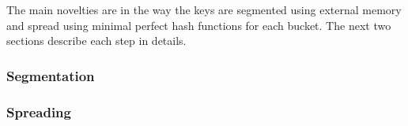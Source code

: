 The main novelties are in the way the keys are segmented using external memory and spread using 
minimal perfect hash functions for each bucket. The next two sections describe each step in details.
\subsubsection{Segmentation}
\subsubsection{Spreading}
% 
% 
% 
